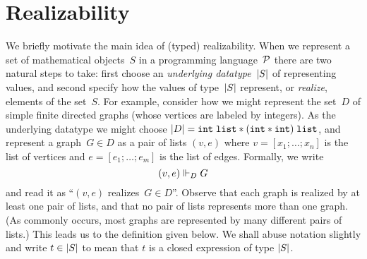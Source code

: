 
\section{Realizability}
\label{sec:realizability}

We briefly motivate the main idea of (typed) realizability. When we
represent a set of mathematical objects~$S$ in a programming
language~$\mathcal{P}$ there are two natural steps to take: first choose an
\emph{underlying datatype~$|S|$} of representing values, and second
specify how the values of type~$|S|$ represent, or \emph{realize},
elements of the set~$S$. For example, consider how we might represent
the set~$D$ of simple finite directed graphs (whose vertices are
labeled by integers). As the underlying datatype we might choose
$|D| = \mathtt{int} \; \mathtt{list} * (\mathtt{int} *
\mathtt{int}) \; \mathtt{list}$, and represent a graph~$G \in D$ as a
pair of lists $(v,e)$ where $v = [x_1; \ldots; x_n]$ is the list of
vertices and $e = [e_1; \ldots; e_m]$ is the list of edges. Formally,
we write
%
\begin{equation*}
  (v, e) \Vdash_D G
\end{equation*}
%
and read it as ``$(v,e)$ realizes~$G \in D$''. Observe that each graph
is realized by at least one pair of lists, and that no pair of lists
represents more than one graph. (As commonly occurs, most graphs are
represented by many different pairs of lists.) This leads us to the definition given
below. We shall abuse notation slightly and write $t \in |S|$ to
mean that $t$ is a closed expression of type $|S|$.


